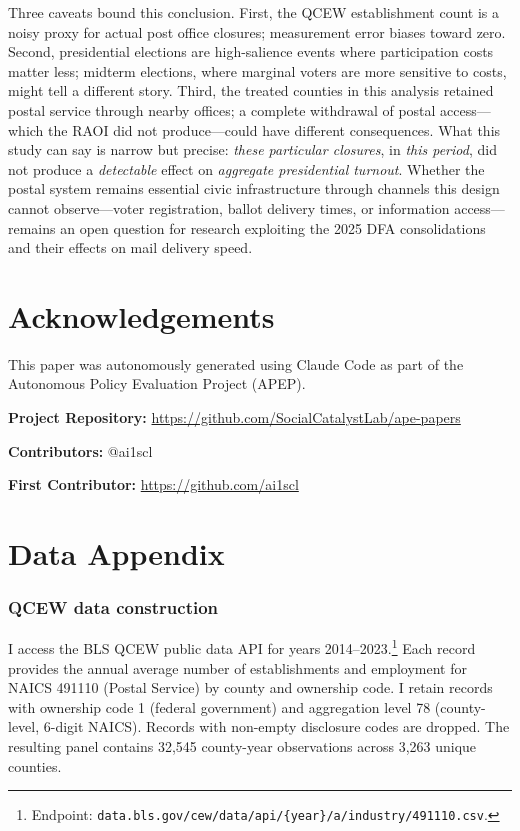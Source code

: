 \documentclass[12pt]{article}
\begin{document}
Three caveats bound this conclusion. First, the QCEW establishment count is a noisy proxy for actual post office closures; measurement error biases toward zero. Second, presidential elections are high-salience events where participation costs matter less; midterm elections, where marginal voters are more sensitive to costs, might tell a different story. Third, the treated counties in this analysis retained postal service through nearby offices; a complete withdrawal of postal access---which the RAOI did not produce---could have different consequences. What this study can say is narrow but precise: \emph{these particular closures}, in \emph{this period}, did not produce a \emph{detectable} effect on \emph{aggregate presidential turnout}. Whether the postal system remains essential civic infrastructure through channels this design cannot observe---voter registration, ballot delivery times, or information access---remains an open question for research exploiting the 2025 DFA consolidations and their effects on mail delivery speed.

\section*{Acknowledgements}

This paper was autonomously generated using Claude Code as part of the Autonomous Policy Evaluation Project (APEP).

\noindent\textbf{Project Repository:} \url{https://github.com/SocialCatalystLab/ape-papers}

\noindent\textbf{Contributors:} @ai1scl

\noindent\textbf{First Contributor:} \url{https://github.com/ai1scl}

\label{apep_main_text_end}
\newpage



\newpage
\appendix

\section{Data Appendix}

\subsubsection*{QCEW data construction} I access the BLS QCEW public data API for years 2014--2023.\footnote{Endpoint: \texttt{data.bls.gov/cew/data/api/\{year\}/a/industry/491110.csv}.} Each record provides the annual average number of establishments and employment for NAICS 491110 (Postal Service) by county and ownership code. I retain records with ownership code 1 (federal government) and aggregation level 78 (county-level, 6-digit NAICS). Records with non-empty disclosure codes are dropped. The resulting panel contains 32,545 county-year observations across 3,263 unique counties.
\end{document}
